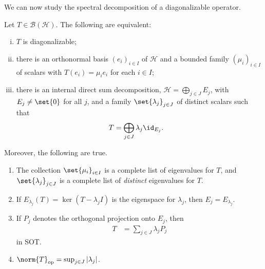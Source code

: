\documentclass[10pt]{mypackage}
\begin{document}
We can now study the spectral decomposition of a diagonalizable operator.
\begin{proposition}
  Let $T\in \mathcal{B}\left(\mathcal{H}\right)$. The following are equivalent:
  \begin{enumerate}[(i)]
    \item $T$ is diagonalizable;
    \item there is an orthonormal basis $\left(e_i\right)_{i\in I}$ of $\mathcal{H}$ and a bounded family $\left(\mu_i\right)_{i\in I}$ of scalars with $T\left(e_i\right) = \mu_ie_i$ for each $i\in I$;
    \item there is an internal direct sum decomposition, $\mathcal{H} = \bigoplus_{j\in J}E_j$, with $E_j\neq \set{0}$ for all $j$, and a family $\set{\lambda_j}_{j\in J}$ of distinct scalars such that
      \begin{align*}
        T &= \bigoplus_{j\in J}\lambda_j\id_{E_j}.
      \end{align*}
  \end{enumerate}
  Moreover, the following are true.
  \begin{enumerate}[(1)]
    \item The collection $\set{\mu_i}_{i\in I}$ is a complete list of eigenvalues for $T$, and $\set{\lambda_j}_{j\in J}$ is a complete list of \textit{distinct} eigenvalues for $T$.
    \item If $E_{\lambda_j}\left(T\right) = \ker\left(T - \lambda_jI\right)$ is the eigenspace for $\lambda_j$, then $E_j = E_{\lambda_j}$.
    \item If $P_j$ denotes the orthogonal projection onto $E_j$, then
      \begin{align*}
        T &= \sum_{j\in J}\lambda_jP_j
      \end{align*}
      in SOT.
    \item $\norm{T}_{\text{op}} = \sup_{j\in J}\left\vert \lambda_j \right\vert$.
  \end{enumerate}
\end{proposition}
\end{document}
